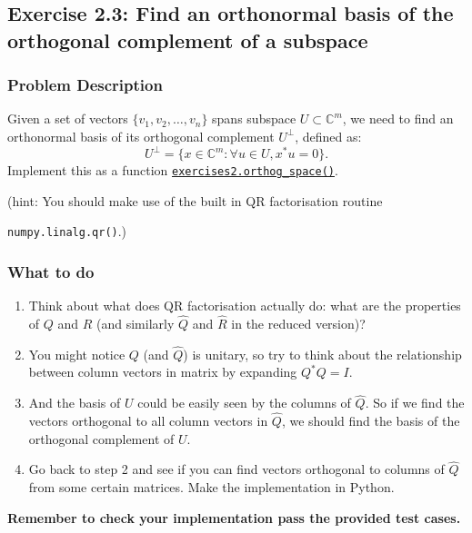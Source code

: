\subsection*{Exercise 2.3: Find an orthonormal basis of the orthogonal complement of a subspace}
\subsubsection*{Problem Description}%
\label{ssub:problem_description}

Given a set of vectors $ \{v_1, v_2, \ldots, v_n\}$ spans subspace $U \subset \mathbb{C}^{m}$, we need to find an orthonormal basis of its orthogonal complement $U^{\bot}$, defined as:
\[
U^{\bot} = \{x \in \mathbb{C}^{m}: \forall u \in U, x^{*}u = 0\} 
.\] 
Implement this as a function \href{https://comp-lin-alg.github.io/cla_utils.html#cla_utils.exercises2.orthog_space}{\texttt{exercises2.orthog\_space()}}. \medskip

\noindent  
(hint: You should make use of the built in QR factorisation routine

\noindent \texttt{numpy.linalg.qr()}.)

\subsubsection*{What to do}%
\label{ssub:what_to_do}

\begin{enumerate}
  \item Think about what does QR factorisation actually do: what are the properties of $Q$ and $R$  (and similarly $\hat{Q}$ and $\hat{R}$ in the reduced version)?
  \item You might notice $Q$ (and $\hat{Q}$) is unitary, so try to think about the relationship between column vectors in matrix by expanding $Q^*Q = I$.
  \item And the basis of $U$ could be easily seen by the columns of $\hat{Q}$. So if we find the vectors orthogonal to all column vectors in $\hat{Q}$, we should find the basis of the orthogonal complement of $U$.
  \item Go back to step 2 and see if you can find vectors orthogonal to columns of \(\hat{Q}\) from some certain matrices. Make the implementation in Python.
\end{enumerate}
\noindent \textbf{Remember to check your implementation pass the provided test cases.}
